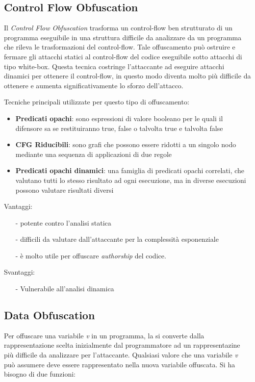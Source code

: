 \documentclass[a4paper,oneside,openright,titlepage,10pt,footinclude,headinclude]{scrbook}
\begin{document}
\subsection{Control Flow Obfuscation}
Il \emph{Control Flow Obfuscation} trasforma un control-flow ben strutturato di un programma eseguibile in una struttura difficile da analizzare da un programma che rileva le trasformazioni del control-flow. Tale offuscamento può ostruire e fermare gli attacchi statici al control-flow del codice eseguibile sotto attacchi di tipo white-box. Questa tecnica costringe l'attaccante ad eseguire attacchi dinamici per ottenere il control-flow, in questo modo diventa molto più difficile da ottenere e aumenta significativamente lo sforzo dell'attacco.

\noindent Tecniche principali utilizzate per questo tipo di offuscamento:
\begin{itemize}
\item
\textbf{Predicati opachi}: sono espressioni di valore booleano per le quali il difensore sa se restituiranno true, false o talvolta true e talvolta false
\item
\textbf{CFG Riducibili}: sono grafi che possono essere ridotti a un singolo nodo mediante una sequenza di applicazioni di due regole
\item
\textbf{Predicati opachi dinamici}: una famiglia di predicati opachi correlati, che valutano tutti lo stesso risultato ad ogni esecuzione, ma in diverse esecuzioni possono valutare risultati diversi
\end{itemize}

Vantaggi: 
\begin{itemize}
\item[-]
potente contro l'analisi statica
\item[-]
difficili da valutare dall'attaccante per la complessità esponenziale
\item[-]
è molto utile per offuscare \emph{authorship} del codice.
\end{itemize}

Svantaggi:
\begin{itemize}
\item[-]
Vulnerabile all'analisi dinamica 
\end{itemize}

\subsection{Data Obfuscation}
Per offuscare una variabile \textit{v} in un programma, la si converte dalla rappresentazione scelta inizialmente dal programmatore ad un rappresentazine più difficile da analizzare per l'attaccante. Qualsiasi valore che una variabile \textit{v} può assumere deve essere
rappresentato nella nuova variabile offuscata. Si ha bisogno di due funzioni: 
\end{document}
